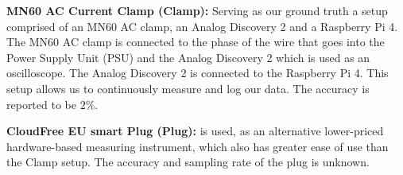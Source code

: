 \noindent\textbf{MN60 AC Current Clamp (Clamp):}
Serving as our ground truth a setup comprised of an MN60 AC clamp, an Analog Discovery 2 and a Raspberry Pi 4. The MN60 AC clamp is connected to the phase of the wire that goes into the Power Supply Unit (PSU) and the Analog Discovery 2 which is used as an oscilloscope. The Analog Discovery 2 is connected to the Raspberry Pi 4. This setup allows us to continuously measure and log our data.\cite{biksbois} The accuracy is reported to be $2\%$\cite{ClampDoc}.\newline

\noindent\textbf{CloudFree EU smart Plug (Plug):} is used, as an alternative lower-priced hardware-based measuring instrument, which also has greater ease of use than the Clamp setup. The accuracy and sampling rate of the plug is unknown.\cite{CloudFreeEUSMartPlug}\newline